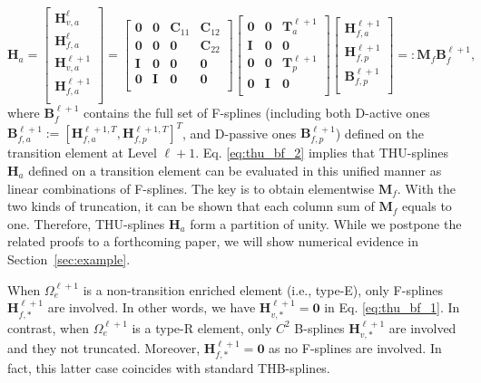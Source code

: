 \documentclass[graybox]{svmult}
\begin{document}
\begin{equation}
\bm{H}_a =
\begin{bmatrix}
\bm{H}_{v,a}^\ell \\ \bm{H}_{f\!,a}^\ell \\ \bm{H}_{v,a}^{\ell+1} \\ \bm{H}_{f\!,a}^{\ell+1} \\
\end{bmatrix}=
\begin{bmatrix}
\bm{0} & \bm{0} & \bm{C}_{11} & \bm{C}_{12} \\
\bm{0} & \bm{0} & \bm{0} & \bm{C}_{22} \\
\bm{I} & \bm{0} & \bm{0} & \bm{0} \\
\bm{0} & \bm{I} & \bm{0} & \bm{0} \\
\end{bmatrix}
\begin{bmatrix}
\bm{0} & \bm{0} & \bm{T}_{a}^{\ell+1} \\
\bm{I} & \bm{0} & \bm{0} \\
\bm{0} & \bm{0} & \bm{T}_{p}^{\ell+1} \\
\bm{0} & \bm{I} & \bm{0} \\
\end{bmatrix}
\begin{bmatrix}
\bm{H}_{f\!,a}^{\ell+1} \\ \bm{H}_{f\!,p}^{\ell+1} \\ \bm{B}_{f\!,p}^{\ell+1} \\
\end{bmatrix} =:
\bm{M}_f \bm{B}_f^{\ell+1},
\label{eq:thu_bf_2}
\end{equation}
where $\bm{B}_f^{\ell+1}$ contains the full set of F-splines (including both D-active ones $\bm{B}_{f\!,a}^{\ell+1}:= [\bm{H}_{f\!,a}^{\ell+1,T}, \bm{H}_{f\!,p}^{\ell+1,T}]^T$, and D-passive ones $\bm{B}_{f\!,p}^{\ell+1}$) defined on the transition element at Level $\ell+1$. Eq. \eqref{eq:thu_bf_2} implies that THU-splines $\bm{H}_a$ defined on a transition element can be evaluated in this unified manner as linear combinations of F-splines. The key is to obtain elementwise $\bm{M}_f$. With the two kinds of truncation, it can be shown that each column sum of $\bm{M}_f$ equals to one. Therefore, THU-splines $\bm{H}_a$ form a partition of unity. While we postpone the related proofs to a forthcoming paper, we will show numerical evidence in Section~\ref{sec:example}. 

When $\Omega_e^{\ell+1}$ is a non-transition enriched element (i.e., type-E), only F-splines $\bm{H}_{f\!,*}^{\ell+1}$ are involved. In other words, we have $\bm{H}_{v,*}^{\ell+1}=\bm{0}$ in Eq. \eqref{eq:thu_bf_1}. In contrast, when $\Omega_e^{\ell+1}$ is a type-R element, only $C^2$ B-splines $\bm{H}_{v,*}^{\ell+1}$ are involved and they not truncated. Moreover, $\bm{H}_{f\!,*}^{\ell+1}=\bm{0}$ as no F-splines are involved. In fact, this latter case coincides with standard THB-splines.
\end{document}
